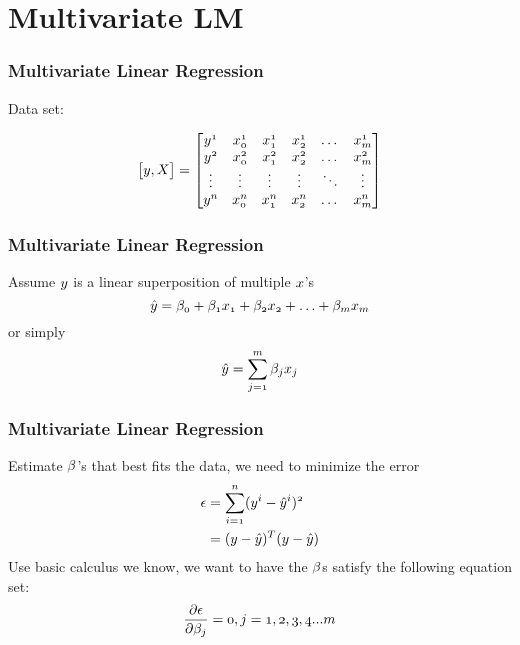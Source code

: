\documentclass[notheorems, aspectratio=54]{beamer}
\begin{document}
\section{Multivariate LM}
\begin{frame}
\frametitle{Multivariate Linear Regression}
Data set:

$$
\begin{bmatrix}

\mathnormal{y, X}

\end{bmatrix}
=
\begin{bmatrix}
    \mathnormal{{y}^{1}}& \mathnormal{x^{1}_{0}}& \mathnormal{x^{1}_{1}} & \mathnormal{x^{1}_{2}} & \dots & \mathnormal{x^{1}_{m}} \\
    \mathnormal{{y}^{2}}& \mathnormal{x^{2}_{0}}& \mathnormal{x^{2}_{1}} & \mathnormal{x^{2}_{2}} & \dots & \mathnormal{x^{2}_{m}} \\
    	\vdots & \vdots     & \vdots & \vdots &\ddots &\vdots\\
    \mathnormal{{y}^{n}}& \mathnormal{x^{n}_{0}}& \mathnormal{x^{n}_{1}} & \mathnormal{x^{n}_{2}} & \dots & \mathnormal{x^{n}_{m}} \\
\end{bmatrix}
$$
\end{frame}

\begin{frame}
\frametitle{Multivariate Linear Regression}
Assume $\mathnormal{y}$ is a linear superposition of multiple $\mathnormal{x}$'s
    $$
	\mathnormal{\hat{y}=\beta_{0}+\beta_{1}x_1+\beta_{2}x_2+\hdots+\beta_{m}x_m}
    $$
    or simply
    $$
	\mathnormal{\hat{y}=\sum\limits_{j=1}^{m}\beta_j x_j}     
	$$
        

\end{frame}

\begin{frame}
\frametitle{Multivariate Linear Regression}
Estimate $\mathnormal{\beta}$'s that best fits the data, we need to minimize the error
    \begin{align*}
        \mathnormal{\epsilon}&=\mathnormal{\sum\limits_{i=1}^{n}(y^{i}-\hat{y}^{i})^2}\\
                &=\mathnormal{(y-\hat{y})^T(y-\hat{y})}
    \end{align*}
Use basic calculus we know, we want to have the  $\mathnormal{\beta}$s satisfy the following equation set:
$$
 \mathnormal{\frac{\partial \epsilon}{\partial \beta_j}=0, j=1, 2, 3, 4 ... m}
$$
\end{frame}
\end{document}
